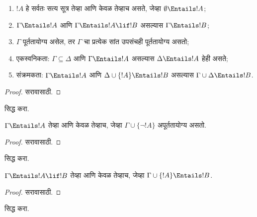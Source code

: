 \documentclass[../../../include/open-logic-section]{subfiles}
\begin{document}
\begin{prop}
\begin{enumerate} 
\item $!A$ हे सर्वतः सत्य सूत्र तेव्हा आणि केवळ तेव्हाच असते, जेव्हा
  $\emptyset \Entails !A$; 
\item $\Gamma \Entails !A$ आणि $\Gamma \Entails !A \lif !B$ असल्यास
  $\Gamma \Entails !B$;
\item $\Gamma$ पूर्ततायोग्य असेल, तर $\Gamma$ चा प्रत्येक सांत उपसंचही
  पूर्ततायोग्य असतो; 
\item {} एकस्वनिकता: $\Gamma \subseteq \Delta$
  आणि $\Gamma \Entails !A$ असल्यास $\Delta \Entails !A$ हेही असते;
\item {} संक्रमकता: $\Gamma \Entails !A$ आणि
  $\Delta \cup \{ !A\} \Entails !B$ असल्यास $\Gamma \cup \Delta \Entails
  !B$.
\end{enumerate}
\end{prop}

\begin{proof}
सरावासाठी.
\end{proof}

\begin{prob}
 सिद्ध करा.
\end{prob}

\begin{prop}
  $\Gamma \Entails !A$ तेव्हा आणि केवळ तेव्हाच, जेव्हा
  $\Gamma \cup \{\lnot !A\}$ अपूर्ततायोग्य असतो.
\end{prop}

\begin{proof}
सरावासाठी.
\end{proof}

\begin{prob}
 सिद्ध करा.
\end{prob}

\begin{thm}
   $\Gamma \Entails !A \lif !B$ तेव्हा आणि केवळ
  तेव्हाच, जेव्हा $\Gamma \cup \{!A\} \Entails !B$.
\end{thm}

\begin{proof}
सरावासाठी.
\end{proof}

\begin{prob}
 सिद्ध करा.
\end{prob}
\end{document}
